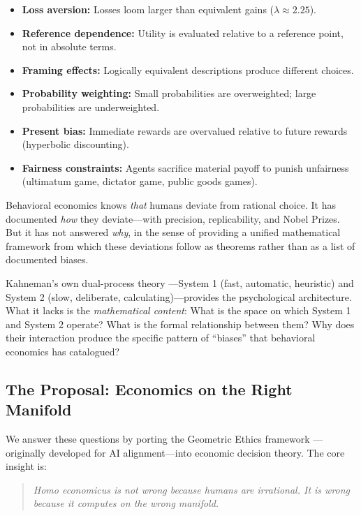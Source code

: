 \documentclass[12pt]{article}
\theoremstyle{definition}
\theoremstyle{remark}
\begin{document}
\begin{itemize}
    \item \textbf{Loss aversion:} Losses loom larger than equivalent gains ($\lambda \approx 2.25$).
    \item \textbf{Reference dependence:} Utility is evaluated relative to a reference point, not in absolute terms.
    \item \textbf{Framing effects:} Logically equivalent descriptions produce different choices.
    \item \textbf{Probability weighting:} Small probabilities are overweighted; large probabilities are underweighted.
    \item \textbf{Present bias:} Immediate rewards are overvalued relative to future rewards (hyperbolic discounting).
    \item \textbf{Fairness constraints:} Agents sacrifice material payoff to punish unfairness (ultimatum game, dictator game, public goods games).
\end{itemize}

Behavioral economics knows \emph{that} humans deviate from rational choice.  It has documented \emph{how} they deviate---with precision, replicability, and Nobel Prizes.  But it has not answered \emph{why}, in the sense of providing a unified mathematical framework from which these deviations follow as theorems rather than as a list of documented biases.

Kahneman's own dual-process theory \cite{kahneman2011}---System 1 (fast, automatic, heuristic) and System 2 (slow, deliberate, calculating)---provides the psychological architecture.  What it lacks is the \emph{mathematical content}: What is the space on which System 1 and System 2 operate?  What is the formal relationship between them?  Why does their interaction produce the specific pattern of ``biases'' that behavioral economics has catalogued?

\subsection{The Proposal: Economics on the Right Manifold}

We answer these questions by porting the Geometric Ethics framework \cite{bond2026geometric}---originally developed for AI alignment---into economic decision theory.  The core insight is:

\begin{quote}
\emph{Homo economicus is not wrong because humans are irrational.  It is wrong because it computes on the wrong manifold.}
\end{quote}
\end{document}
